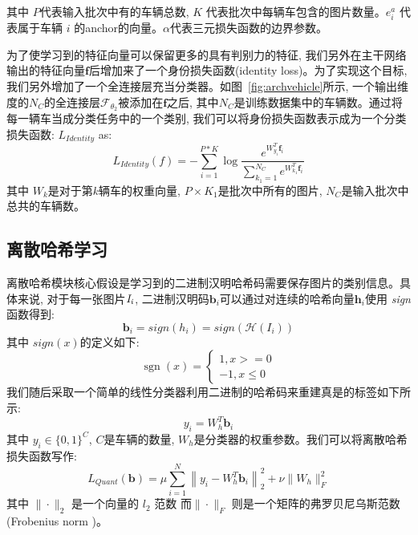 其中 $P$代表输入批次中有的车辆总数, $K$ 代表批次中每辆车包含的图片数量。$e_{i}^a$ 代表属于车辆 $i$ 的anchor的向量。$\alpha$代表三元损失函数的边界参数。\par
为了使学习到的特征向量可以保留更多的具有判别力的特征, 我们另外在主干网络输出的特征向量$\mathbf{f}$后增加来了一个身份损失函数(identity loss)。为了实现这个目标, 我们另外增加了一个全连接层充当分类器。如图~\ref{fig:archvehicle}所示, 一个输出维度的$N_C$的全连接层$\mathcal{F}_{\theta_2}$被添加在$\mathbf{f}$之后, 其中$N_C$是训练数据集中的车辆数。通过将每一辆车当成分类任务中的一个类别, 我们可以将身份损失函数表示成为一个分类损失函数:
 $L_{Identity}$ as:
\begin{equation}
L_{Identity}(f)=-\sum_{i=1}^{P*K} \log \frac{e^{{W}_{y_{i}}^{T} \mathbf{f}_i }}{\sum_{k_1=1}^{N_C} e^{{W}_{k_1}^{T} \mathbf{f}_{i}}}
\label{eq:identity}
\end{equation}
其中 $W_k$是对于第$k$辆车的权重向量, $P \times K_1$是批次中所有的图片, $N_C$是输入批次中总共的车辆数。
\subsection{离散哈希学习}
离散哈希模块核心假设是学习到的二进制汉明哈希码需要保存图片的类别信息。具体来说, 对于每一张图片$\it{I}_i$, 二进制汉明码$\mathbf{b}_i$可以通过对连续的哈希向量$\mathbf{h}_i$使用 \textit{sign} 函数得到:
\begin{equation}
    \mathbf{b}_i = \textit{sign}(h_i) = \textit{sign}(\mathcal{H}(\textit{I}_i))
\end{equation}
其中 $\textit{sign}(x)$的定义如下:
\begin{equation}
\operatorname{sgn}(x)=\left\{\begin{array}{c}
1, x>=0 \\
-1, x \le 0 
\end{array}\right.
\end{equation}
我们随后采取一个简单的线性分类器利用二进制的哈希码来重建真是的标签如下所示:
\begin{equation}
    y_i = W^T_h\mathbf{b}_i
\end{equation}
其中  $y_i \in \{0,1\}^C$, $C$是车辆的数量, $W_h$是分类器的权重参数。我们可以将离散哈希损失函数写作:
\begin{equation}
    L_{Quant}(\mathbf{b}) =  \mu\sum_{i=1}^{N}\left\|y_{i}-W^{T}_h \mathbf{b}_{i}\right\|_{2}^{2}+\nu \|W_h\|_{F}^{2}  
\end{equation}
其中 $\|\cdot\|_{2}$ 是一个向量的 $l_2$ 范数 而$\|\cdot\|_{F}$ 则是一个矩阵的弗罗贝尼乌斯范数 (Frobenius norm )。
